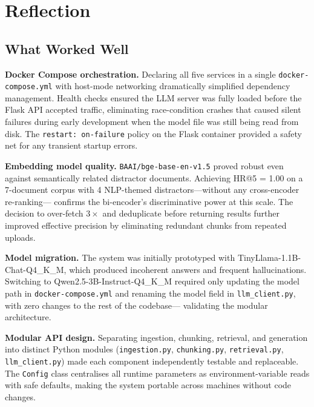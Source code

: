 \documentclass[10pt]{article}
\begin{document}
\section{Reflection}

\subsection{What Worked Well}

\textbf{Docker Compose orchestration.}
Declaring all five services in a single \texttt{docker-compose.yml} with
host-mode networking dramatically simplified dependency management.
Health checks ensured the LLM server was fully loaded before the Flask API
accepted traffic, eliminating race-condition crashes that caused silent
failures during early development when the model file was still being read
from disk.
The \texttt{restart: on-failure} policy on the Flask container provided
a safety net for any transient startup errors.

\textbf{Embedding model quality.}
\texttt{BAAI/bge-base-en-v1.5} proved robust even against semantically
related distractor documents. Achieving HR@5 = 1.00 on a 7-document corpus
with 4 NLP-themed distractors---without any cross-encoder re-ranking---
confirms the bi-encoder's discriminative power at this scale.
The decision to over-fetch $3\times$ and deduplicate before returning results
further improved effective precision by eliminating redundant chunks from
repeated uploads.

\textbf{Model migration.}
The system was initially prototyped with TinyLlama-1.1B-Chat-Q4\_K\_M, which
produced incoherent answers and frequent hallucinations.
Switching to Qwen2.5-3B-Instruct-Q4\_K\_M required only updating the model
path in \texttt{docker-compose.yml} and renaming the model field in
\texttt{llm\_client.py}, with zero changes to the rest of the codebase---
validating the modular architecture.

\textbf{Modular API design.}
Separating ingestion, chunking, retrieval, and generation into distinct
Python modules (\texttt{ingestion.py}, \texttt{chunking.py},
\texttt{retrieval.py}, \texttt{llm\_client.py}) made each component
independently testable and replaceable.
The \texttt{Config} class centralises all runtime parameters as
environment-variable reads with safe defaults, making the system portable
across machines without code changes.
\end{document}
